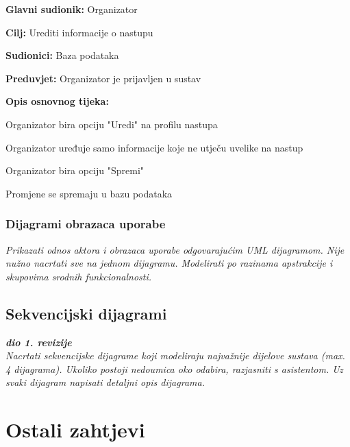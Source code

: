	\noindent {}
	\begin{packed_item}
		
		\item \textbf{Glavni sudionik: } Organizator
		\item  \textbf{Cilj:} Urediti informacije o nastupu
		\item  \textbf{Sudionici:} Baza podataka
		\item  \textbf{Preduvjet:} Organizator je prijavljen u sustav
		\item  \textbf{Opis osnovnog tijeka:} 
		
		\item[] \begin{packed_enum}
			
			\item Organizator bira opciju "Uredi" na profilu nastupa
			\item Organizator uređuje samo informacije koje ne utječu uvelike na nastup
			\item Organizator bira opciju "Spremi"
			\item Promjene se spremaju u bazu podataka
		\end{packed_enum}  
	\end{packed_item}
				
				\subsubsection{Dijagrami obrazaca uporabe}
				
				
				
					
					\textit{Prikazati odnos aktora i obrazaca uporabe odgovarajućim UML dijagramom. Nije nužno nacrtati sve na jednom dijagramu. Modelirati po razinama apstrakcije i skupovima srodnih funkcionalnosti.}
				\eject				
				
				
			\subsection{Sekvencijski dijagrami}
				
				\textbf{\textit{dio 1. revizije}}\\
				
				\textit{Nacrtati sekvencijske dijagrame koji modeliraju najvažnije dijelove sustava (max. 4 dijagrama). Ukoliko postoji nedoumica oko odabira, razjasniti s asistentom. Uz svaki dijagram napisati detaljni opis dijagrama.}
				\eject
	
		\section{Ostali zahtjevi}
		
